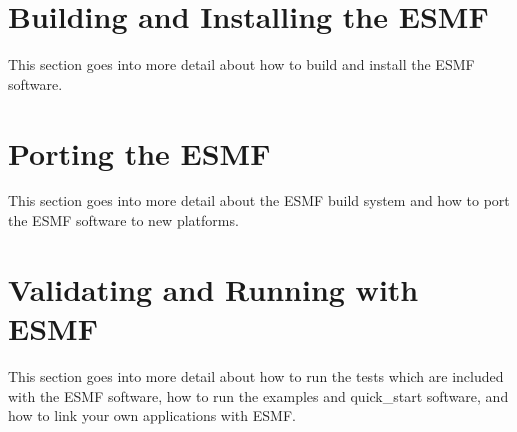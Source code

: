 
\setlength{\parskip}{1.5ex}
\setlength{\parindent}{0em}


\section{Building and Installing the ESMF}
\label{sec:TechOver}

This section goes into more detail about how to build and install the ESMF
software.




\section{Porting the ESMF}
\label{sec:TechOverPort}

This section goes into more detail about the ESMF build system and how to
port the ESMF software to new platforms.




\section{Validating and Running with ESMF}
\label{sec:TechOver2}

This section goes into more detail about how to run the tests which are
included with the ESMF software, how to run the examples and
quick\_start software, and how to link your own applications with ESMF.




%
